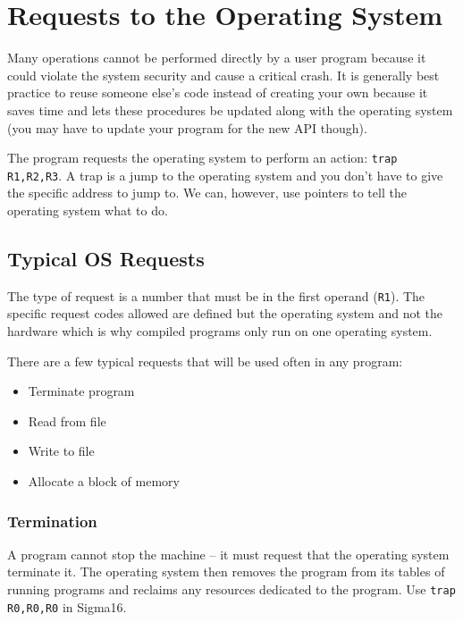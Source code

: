 \section{Requests to the Operating System}\label{sec:requests_to_the_operating_system}

Many operations cannot be performed directly by a user program because it could violate the system security and cause a critical crash.
It is generally best practice to reuse someone else's code instead of creating your own because it saves time and lets these procedures be updated along with the operating system (you may have to update your program for the new API though).

The program requests the operating system to perform an action: \texttt{trap R1,R2,R3}.
A trap is a jump to the operating system and you don't have to give the specific address to jump to.
We can, however, use pointers to tell the operating system what to do.

\subsection{Typical OS Requests}\label{sub:typical_os_requests}

The type of request is a number that must be in the first operand (\texttt{R1}).
The specific request codes allowed are defined but the operating system and not the hardware which is why compiled programs only run on one operating system.

There are a few typical requests that will be used often in any program:
\begin{itemize}
	\item Terminate program
	\item Read from file
	\item Write to file
	\item Allocate a block of memory
\end{itemize}

\subsubsection{Termination}\label{ssub:termination}

A program cannot stop the machine -- it must request that the operating system terminate it.
The operating system then removes the program from its tables of running programs and reclaims any resources dedicated to the program.
Use \texttt{trap R0,R0,R0} in Sigma16.

